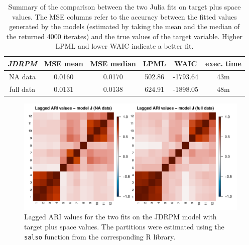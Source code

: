 \documentclass[12pt,	%
	a4paper,		%
	twoside,		%
	openright,		%
	titlepage,%
	]{book}
\theoremstyle{definition}
\newcommand{\mjline}[1]{\texttt{#1}}
\begin{document}
\begin{table}[!ht]
    \caption[Accuracy metrics of JDRPM fits, target plus space values, full vs NA dataset]{Summary of the comparison between the two Julia fits on target plus space values. The MSE columns refer to the accuracy between the fitted values generated by the models (estimated by taking the mean and the median of the returned 4000 iterates) and the true values of the target variable. Higher LPML and lower WAIC indicate a better fit.}
    \centering
    \begin{tabular}{cccccc}
    \toprule
           \textit{JDRPM} & MSE mean &  MSE median & LPML & WAIC & exec. time  \\
           \midrule 
        NA data & 0.0160 &  0.0170  &  502.86 & -1793.64 & 43m\\
        full data & 0.0131  & 0.0138   & 624.91 & -1898.05  &  48m \\
        \bottomrule
    \end{tabular}
    \label{tab: fits metrics space julias na full}
\end{table}


\begin{figure}[!ht]
    \centering
    \includegraphics[width=1\linewidth]{Testing/NA data/space/ari.pdf}
    \caption[Lagged ARI values of JDRPM fits, target plus space values, full vs NA dataset]{Lagged ARI values for the two fits on the JDRPM model with target plus space values. The partitions were estimated using the \mjline{salso} function from the corresponding R library.}
    \label{fig: ari space na}
\end{figure}
\end{document}
